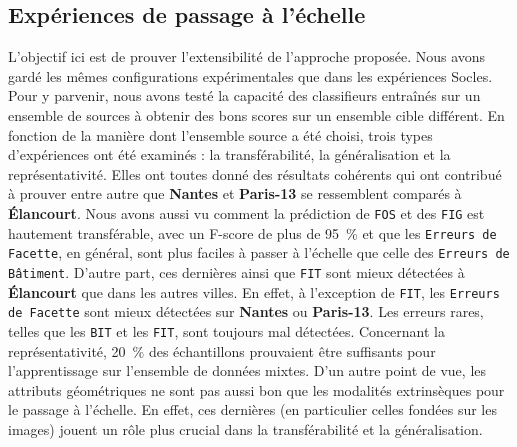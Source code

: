     \subsection*{Expériences de passage à l'échelle}
        L'objectif ici est de prouver l'extensibilité de l'approche proposée.
        Nous avons gardé les mêmes configurations expérimentales que dans les expériences Socles.
        Pour y parvenir, nous avons testé la capacité des classifieurs entraînés sur un ensemble de sources à obtenir des bons scores sur un ensemble cible différent.
        En fonction de la manière dont l'ensemble source a été choisi, trois types d'expériences ont été examinés : la transférabilité, la généralisation et la représentativité.
        Elles ont toutes donné des résultats cohérents qui ont contribué à prouver entre autre que \textbf{Nantes} et \textbf{Paris-13} se ressemblent comparés à \textbf{\'Elancourt}.
        Nous avons aussi vu comment la prédiction de \texttt{FOS} et des \texttt{FIG} est hautement transférable, avec un F-score de plus de \SI[locale=FR]{95}{\percent} et que les \texttt{Erreurs de Facette}, en général, sont plus faciles à passer à l'échelle que celle des \texttt{Erreurs de Bâtiment}.
        D'autre part, ces dernières ainsi que \texttt{FIT} sont mieux détectées à \textbf{\'Elancourt} que dans les autres villes.
        En effet, à l'exception de \texttt{FIT}, les \texttt{Erreurs de Facette} sont mieux détectées sur \textbf{Nantes} ou \textbf{Paris-13}.
        Les erreurs rares, telles que les \texttt{BIT} et les \texttt{FIT}, sont toujours mal détectées.
        Concernant la représentativité, \SI[locale=FR]{20}{\percent} des échantillons prouvaient être suffisants pour l'apprentissage sur l'ensemble de données mixtes.
        D'un autre point de vue, les attributs géométriques ne sont pas aussi bon que les modalités extrinsèques pour le passage à l'échelle.
        En effet, ces dernières (en particulier celles fondées sur les images) jouent un rôle plus crucial dans la transférabilité et la généralisation.

